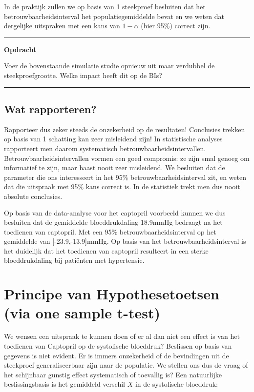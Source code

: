 \documentclass[
  12pt,dutch,coursenotes]{book}
\begin{document}
In de praktijk zullen we op basis van 1 steekproef besluiten dat het betrouwbaarheidsinterval het populatiegemiddelde bevat en we weten dat dergelijke uitspraken met een kans van \(1-\alpha\) (hier 95\%) correct zijn.

\begin{center}\rule{0.5\linewidth}{0.5pt}\end{center}

\textbf{Opdracht}

Voer de bovenstaande simulatie studie opnieuw uit maar verdubbel de steekproefgrootte. Welke impact heeft dit op de BIs?

\begin{center}\rule{0.5\linewidth}{0.5pt}\end{center}

\hypertarget{wat-rapporteren}{%
\subsection{Wat rapporteren?}\label{wat-rapporteren}}

Rapporteer dus zeker steeds de onzekerheid op de resultaten! Conclusies trekken op basis van 1 schatting kan zeer misleidend zijn! In statistische analyses rapporteert men daarom systematisch betrouwbaarheidsintervallen.
Betrouwbaarheidsintervallen vormen een goed compromis: ze zijn smal genoeg om informatief te zijn, maar haast nooit zeer misleidend. We besluiten dat de parameter die ons interesseert in het 95\% betrouwbaarheidsinterval zit,
en weten dat die uitspraak met 95\% kans correct is.
In de statistiek trekt men dus nooit absolute conclusies.

Op basis van de data-analyse voor het captopril voorbeeld kunnen we dus besluiten dat de gemiddelde bloeddrukdaling
18.9mmHg bedraagt na het toedienen van captopril. Met een 95\% betrouwbaarheidsinterval op het gemiddelde van {[}-23.9,-13.9{]}mmHg.
Op basis van het betrouwbaarheidsinterval is het duidelijk dat het toedienen van captopril resulteert in een sterke bloeddrukdaling bij patiënten met hypertensie.

\hypertarget{principe-van-hypothesetoetsen-via-one-sample-t-test}{%
\section{Principe van Hypothesetoetsen (via one sample t-test)}\label{principe-van-hypothesetoetsen-via-one-sample-t-test}}

We wensen een uitspraak te kunnen doen of er al dan niet een effect is van het toedienen van Captopril op de systolische bloeddruk? Beslissen op basis van gegevens is niet evident. Er is immers onzekerheid of de bevindingen uit de steekproef
generaliseerbaar zijn naar de populatie. We stellen ons dus de vraag of het schijnbaar gunstig effect systematisch of toevallig is?
Een natuurlijke beslissingsbasis is het gemiddeld verschil \(X\) in de systolische bloeddruk:
\end{document}
